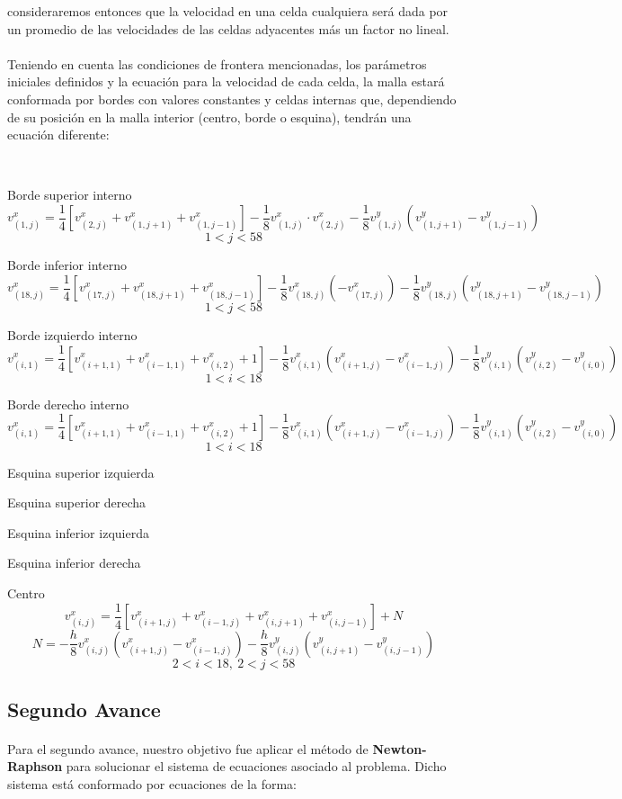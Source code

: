 \documentclass{article}
\begin{document}
  consideraremos entonces que la velocidad en una celda cualquiera será dada por un promedio de las velocidades de las celdas adyacentes más un factor no lineal.

  \paragraph{}
  Teniendo en cuenta las condiciones de frontera mencionadas, los parámetros iniciales definidos y la ecuación para la velocidad de cada celda, la malla estará conformada por bordes con valores constantes y celdas internas que, dependiendo de su posición en la malla interior (centro, borde o esquina), tendrán una ecuación diferente:

  \

  Borde superior interno
  \[v_{(1,j)}^x=\frac{1}{4}[v_{(2,j)}^x+v_{(1,j+1)}^x+v_{(1,j-1)}^x]-\frac{1}{8}v_{(1,j)}^x \cdot v_{(2,j)}^x-\frac{1}{8}v_{(1,j)}^y(v_{(1,j+1)}^y-v_{(1,j-1)}^y)\]
  \[1<j<58\]

  Borde inferior interno
  \[v_{(18,j)}^x=\frac{1}{4}[v_{(17,j)}^x+v_{(18,j+1)}^x+v_{(18,j-1)}^x]-\frac{1}{8}v_{(18,j)}^x(-v_{(17,j)}^x)-\frac{1}{8}v_{(18,j)}^y(v_{(18,j+1)}^y-v_{(18,j-1)}^y)\]
  \[1<j<58\]

  Borde izquierdo interno
  \[v_{(i,1)}^x=\frac{1}{4}[v_{(i+1,1)}^x+v_{(i-1,1)}^x+v_{(i,2)}^x+1]-\frac{1}{8}v_{(i,1)}^x(v_{(i+1,j)}^x-v_{(i-1,j)}^x)-\frac{1}{8}v_{(i,1)}^y(v_{(i,2)}^y-v_{(i,0)}^y)\]
  \[1<i<18\]

  Borde derecho interno
  \[v_{(i,1)}^x=\frac{1}{4}[v_{(i+1,1)}^x+v_{(i-1,1)}^x+v_{(i,2)}^x+1]-\frac{1}{8}v_{(i,1)}^x(v_{(i+1,j)}^x-v_{(i-1,j)}^x)-\frac{1}{8}v_{(i,1)}^y(v_{(i,2)}^y-v_{(i,0)}^y)\]
  \[1<i<18\]

  Esquina superior izquierda

  Esquina superior derecha

  Esquina inferior izquierda

  Esquina inferior derecha

  Centro
  \[v_{(i,j)}^x=\frac{1}{4}[v_{(i+1,j)}^x+v_{(i-1,j)}^x+v_{(i,j+1)}^x+v_{(i,j-1)}^x]+N\]
  \[N=-\frac{h}{8}v_{(i,j)}^x(v_{(i+1,j)}^x-v_{(i-1,j)}^x)-\frac{h}{8}v_{(i,j)}^y(v_{(i,j+1)}^y-v_{(i,j-1)}^y)\]
  \[2<i<18, \ 2<j<58\]

  \subsection*{Segundo Avance}
  \paragraph{}
  Para el segundo avance, nuestro objetivo fue aplicar el método de \textbf{Newton-Raphson} para solucionar el sistema de ecuaciones asociado al problema. Dicho sistema está conformado por ecuaciones de la forma:
\end{document}
